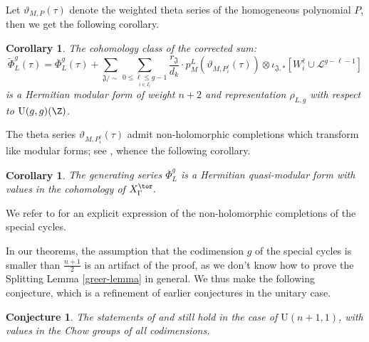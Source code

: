 \documentclass[11pt,letterpaper,english]{amsart}
\numberwithin{equation}{subsection}
\numberwithin{equation}{section}
\newcommand\fJ{{\mathfrak J}}
\theoremstyle{plain}
\newtheorem{corollary}[theorem]{Corollary}
\newtheorem{conjecture}[theorem]{Conjecture}
\theoremstyle{remark}
\begin{document}
Let $\vartheta_{M,P}(\tau)$ denote the weighted theta series of the homogeneous polynomial $P$, then we get the following corollary. 
\begin{corollary}
  
The cohomology class of the corrected sum: 
\[\widetilde{\Phi}^g_L(\tau) = \overline{\Phi}_L^g(\tau)+\sum_{\fJ/\sim}\sum_{\underset{i\in I_{\ell}}{0\leq \ell\leq g-1}}\frac{r_\fJ}{d_k}\cdot p_M^L(\vartheta_{M,{P^{\ell}_i}}(\tau))\otimes \mathfrak \iota_{\fJ,*}[W_i^\ell\cup \mathcal{L}^{g-\ell-1}]\]
is a Hermitian modular form of weight $n+2$ and representation $\rho_{L,g}$ with respect to
$\mathrm{U}(g,g)(\Z)$.  
\end{corollary}



The theta series  $\vartheta_{M,{P^{\ell}_i}}(\tau)$ admit non-holomorphic completions which transform like modular forms; see , whence the following corollary.

\begin{corollary}\label{c:hermitian-quasi-modular}
    The generating series $\overline{\Phi}_L^g$ is a Hermitian quasi-modular form with values in the cohomology of $X^\tor_\Gamma.$
\end{corollary}

We refer to  for an explicit expression of the non-holomorphic completions of the special cycles.

In our theorems, the assumption that the codimension $g$ of the special cycles is smaller than $\frac{n+1}{2}$ is an artifact of the proof, as we don't know how to prove the Splitting Lemma \ref{greer-lemma} in general. We thus make the following conjecture, which is a refinement of earlier conjectures in the unitary case.
\begin{conjecture}
    The statements of  and  still hold in the case of $\mathrm{U}(n+1,1)$, with values in the Chow groups of all codimensions. 
 \end{conjecture}
 
\end{document}
